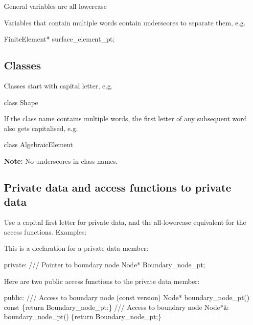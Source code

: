 \begin{DoxyItemize}
\item General variables are all lowercase
\item Variables that contain multiple words contain underscores to separate them, e.\+g. 
\begin{DoxyCode}
FiniteElement* surface\_element\_pt; 
\end{DoxyCode}

\end{DoxyItemize}\hypertarget{index_classes}{}\subsection{Classes}\label{index_classes}

\begin{DoxyItemize}
\item Classes start with capital letter, e.\+g. 
\begin{DoxyCode}
\textcolor{keyword}{class }Shape 
\end{DoxyCode}

\item If the class name contains multiple words, the first letter of any subsequent word also gets capitalised, e.\+g. 
\begin{DoxyCode}
\textcolor{keyword}{class }AlgebraicElement 
\end{DoxyCode}
 {\bfseries Note\+:} No underscores in class names.
\end{DoxyItemize}\hypertarget{index_private_public}{}\subsection{Private data and access functions to  private data}\label{index_private_public}
Use a capital first letter for private data, and the all-\/lowercase equivalent for the access functions. Examples\+:
\begin{DoxyItemize}
\item This is a declaration for a private data member\+: 
\begin{DoxyCode}
\textcolor{keyword}{private}: 
\textcolor{comment}{}
\textcolor{comment}{  /// Pointer to boundary node}
\textcolor{comment}{}  Node* Boundary\_node\_pt; 
\end{DoxyCode}

\item Here are two public access functions to the private data member\+: 
\begin{DoxyCode}
\textcolor{keyword}{public}: 
\textcolor{comment}{}
\textcolor{comment}{ /// Access to boundary node (const version)}
\textcolor{comment}{} Node* boundary\_node\_pt()\textcolor{keyword}{ const }\{\textcolor{keywordflow}{return} Boundary\_node\_pt;\}
\textcolor{comment}{}
\textcolor{comment}{ /// Access to boundary node}
\textcolor{comment}{} Node*& boundary\_node\_pt() \{\textcolor{keywordflow}{return} Boundary\_node\_pt;\}
\end{DoxyCode}

\end{DoxyItemize}

